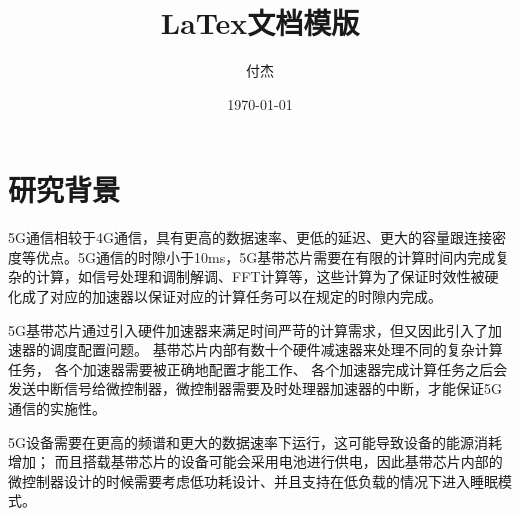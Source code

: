 \documentclass[a4paper, 12pt]{article}
\title{LaTex文档模版}
\author{付杰}
\date{\today}
\newif\ifchinese %
\begin{document}

\tableofcontents %
\clearpage





\setcounter{page}{1}
\section{研究背景}%
5G通信相较于4G通信，具有更高的数据速率、更低的延迟、更大的容量跟连接密度等优点。5G通信的时隙小于10ms，5G基带芯片需要在有限的计算时间内完成复杂的计算，如信号处理和调制解调、FFT计算等，这些计算为了保证时效性被硬化成了对应的加速器以保证对应的计算任务可以在规定的时隙内完成\cite{8920308}。

5G基带芯片通过引入硬件加速器来满足时间严苛的计算需求，但又因此引入了加速器的调度配置问题。
基带芯片内部有数十个硬件减速器来处理不同的复杂计算任务，
各个加速器需要被正确地配置才能工作、
各个加速器完成计算任务之后会发送中断信号给微控制器，微控制器需要及时处理器加速器的中断，才能保证5G通信的实施性\cite{9048785}。

5G设备需要在更高的频谱和更大的数据速率下运行，这可能导致设备的能源消耗增加；
而且搭载基带芯片的设备可能会采用电池进行供电，因此基带芯片内部的微控制器设计的时候需要考虑低功耗设计、并且支持在低负载的情况下进入睡眠模式\cite{9336351}。
\end{document}
